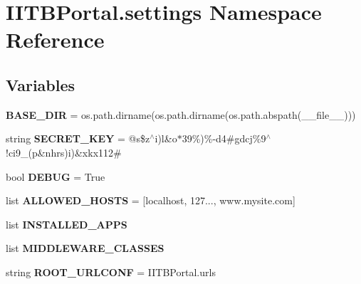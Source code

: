 \hypertarget{namespaceIITBPortal_1_1settings}{}\section{I\+I\+T\+B\+Portal.\+settings Namespace Reference}
\label{namespaceIITBPortal_1_1settings}
\subsection*{Variables}
\begin{DoxyCompactItemize}
\item 
\mbox{\label{namespaceIITBPortal_1_1settings_ae2a4108eb7f8bc69f766a249416145f2}} 
{\bfseries B\+A\+S\+E\+\_\+\+D\+IR} = os.\+path.\+dirname(os.\+path.\+dirname(os.\+path.\+abspath(\+\_\+\+\_\+file\+\_\+\+\_\+)))
\item 
\mbox{\label{namespaceIITBPortal_1_1settings_ac55a0610adbb41a4d66580180e2e14b2}} 
string {\bfseries S\+E\+C\+R\+E\+T\+\_\+\+K\+EY} = \textquotesingle{}@s\$z$^\wedge$i)l\&o$\ast$39\%)\%-\/d4\#gdcj\%9$^\wedge$!ci9\+\_\+(p\&nhrs)i)\&xkx112\#\textquotesingle{}
\item 
\mbox{\label{namespaceIITBPortal_1_1settings_a51bd593ded3061eee373f506e6b72f30}} 
bool {\bfseries D\+E\+B\+UG} = True
\item 
\mbox{\label{namespaceIITBPortal_1_1settings_a56b0fb757cd2a730997985845baa0863}} 
list {\bfseries A\+L\+L\+O\+W\+E\+D\+\_\+\+H\+O\+S\+TS} = \mbox{[}\textquotesingle{}localhost\textquotesingle{}, \textquotesingle{}127...\textquotesingle{}, \textquotesingle{}www.\+mysite.\+com\textquotesingle{}\mbox{]}
\item 
list {\bfseries I\+N\+S\+T\+A\+L\+L\+E\+D\+\_\+\+A\+P\+PS}
\item 
list {\bfseries M\+I\+D\+D\+L\+E\+W\+A\+R\+E\+\_\+\+C\+L\+A\+S\+S\+ES}
\item 
\mbox{\label{namespaceIITBPortal_1_1settings_a74d9680f539826945738160a83d275f9}} 
string {\bfseries R\+O\+O\+T\+\_\+\+U\+R\+L\+C\+O\+NF} = \textquotesingle{}I\+I\+T\+B\+Portal.\+urls\textquotesingle{}
\item 

\end{DoxyCompactItemize}
